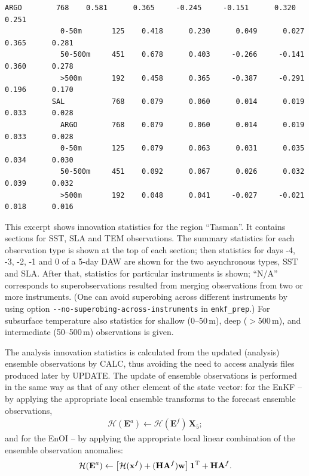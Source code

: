 \documentclass[11pt]{report}
\newcommand{\mb} {\mathbf}
\newcommand{\T}{^{\tiny \mathrm T}}
\begin{document}
\begin{Verbatim}[frame=single,fontsize=\footnotesize]
             ARGO        768    0.581      0.365     -0.245     -0.151      0.320      0.251  
             0-50m       125    0.418      0.230      0.049      0.027      0.365      0.281  
             50-500m     451    0.678      0.403     -0.266     -0.141      0.360      0.278  
             >500m       192    0.458      0.365     -0.387     -0.291      0.196      0.170  
           SAL           768    0.079      0.060      0.014      0.019      0.033      0.028  
             ARGO        768    0.079      0.060      0.014      0.019      0.033      0.028  
             0-50m       125    0.079      0.063      0.031      0.035      0.034      0.030  
             50-500m     451    0.092      0.067      0.026      0.032      0.039      0.032  
             >500m       192    0.048      0.041     -0.027     -0.021      0.018      0.016  
\end{Verbatim}
This excerpt shows innovation statistics for the region ``Tasman''.
It contains sections for SST, SLA and TEM observations.
The summary statistics for each observation type is shown at the top of each section; then statistics for days -4, -3, -2, -1 and 0 of a 5-day DAW are shown for the two asynchronous types, SST and SLA.
After that, statistics for particular instruments is shown; ``N/A'' corresponds to superobservations resulted from merging observations from two or more instruments.
(One can avoid superobing across different instruments by using option \verb|--no-superobing-across-instruments| in \verb|enkf_prep|.)
For subsurface temperature also statistics for shallow (0--50\,m), deep ($>$500\,m), and intermediate (50--500\,m) observations is given.

The analysis innovation statistics is calculated from the updated (analysis) ensemble observations by CALC, thus avoiding the need to access analysis files produced later by UPDATE.
The update of ensemble observations is performed in the same way as that of any other element of the state vector:
for the EnKF -- by applying the appropriate local ensemble transforms to the forecast ensemble observations,
\begin{align*}
  \mathcal H (\mb E^a) \leftarrow \mathcal H (\mb E^f) \, \mb X_5;
\end{align*}
and for the EnOI -- by applying the appropriate local linear combination of the ensemble observation anomalies:
\begin{align*}
  \mathcal H (\mb E^a) \leftarrow \left[ \mathcal H (\mb x^f) + (\mb H \mb A^f) \mb w\right] \mb 1\T + \mb H \mb A^f.
\end{align*}
\end{document}
